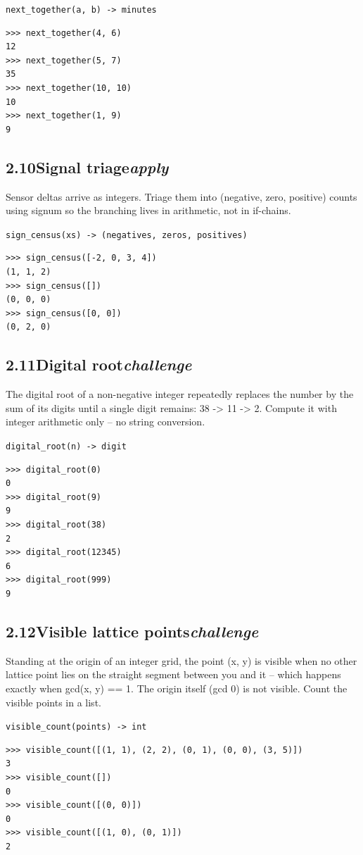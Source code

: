 \documentclass[10pt,letterpaper]{book}
\begin{document}
\noindent\texttt{next\_together(a, b) -> minutes}
\begin{lstlisting}[style=ex]
>>> next_together(4, 6)
12
>>> next_together(5, 7)
35
>>> next_together(10, 10)
10
>>> next_together(1, 9)
9
\end{lstlisting}
\subsection*{2.10\quad Signal triage\hfill\textnormal{\textit{apply}}}
Sensor deltas arrive as integers. Triage them into (negative, zero, positive) counts using signum so the branching lives in arithmetic, not in if-chains.

\noindent\texttt{sign\_census(xs) -> (negatives, zeros, positives)}
\begin{lstlisting}[style=ex]
>>> sign_census([-2, 0, 3, 4])
(1, 1, 2)
>>> sign_census([])
(0, 0, 0)
>>> sign_census([0, 0])
(0, 2, 0)
\end{lstlisting}

\subsection*{2.11\quad Digital root\hfill\textnormal{\textit{challenge}}}
The digital root of a non-negative integer repeatedly replaces the number by the sum of its digits until a single digit remains: 38 -> 11 -> 2. Compute it with integer arithmetic only -- no string conversion.

\noindent\texttt{digital\_root(n) -> digit}
\begin{lstlisting}[style=ex]
>>> digital_root(0)
0
>>> digital_root(9)
9
>>> digital_root(38)
2
>>> digital_root(12345)
6
>>> digital_root(999)
9
\end{lstlisting}
\subsection*{2.12\quad Visible lattice points\hfill\textnormal{\textit{challenge}}}
Standing at the origin of an integer grid, the point (x, y) is visible when no other lattice point lies on the straight segment between you and it -- which happens exactly when gcd(x, y) == 1. The origin itself (gcd 0) is not visible. Count the visible points in a list.

\noindent\texttt{visible\_count(points) -> int}
\begin{lstlisting}[style=ex]
>>> visible_count([(1, 1), (2, 2), (0, 1), (0, 0), (3, 5)])
3
>>> visible_count([])
0
>>> visible_count([(0, 0)])
0
>>> visible_count([(1, 0), (0, 1)])
2
\end{lstlisting}
\clearpage
\end{document}
